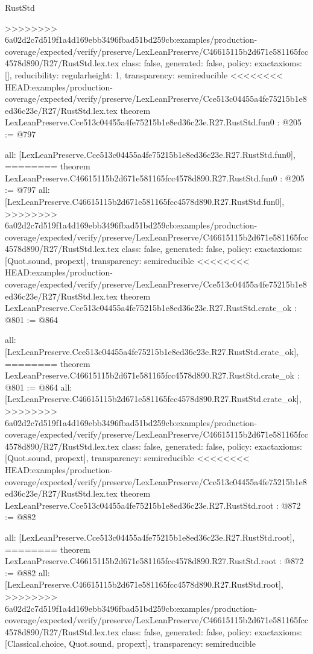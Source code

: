 \begin{lexlean}{RustStd}
\begin{coremodule}
{\begin{coremodule}
{{{>>>>>>>> 6a02d2c7d519f1a4d169ebb3496fbad51bd259cb:examples/production-coverage/expected/verify/preserve/LexLeanPreserve/C46615115b2d671e581165fcc4578d890/R27/RustStd.lex.tex
  class: false,
  generated: false,
  policy: exact{axioms: []},
  reducibility: regular{height: 1},
  transparency: semireducible
}
<<<<<<<< HEAD:examples/production-coverage/expected/verify/preserve/LexLeanPreserve/Cce513c04455a4fe75215b1e8ed36c23e/R27/RustStd.lex.tex
theorem LexLeanPreserve.Cce513c04455a4fe75215b1e8ed36c23e.R27.RustStd.fun0 : @205 := @797 {
  all: [LexLeanPreserve.Cce513c04455a4fe75215b1e8ed36c23e.R27.RustStd.fun0],
========
theorem LexLeanPreserve.C46615115b2d671e581165fcc4578d890.R27.RustStd.fun0 : @205 := @797 {
  all: [LexLeanPreserve.C46615115b2d671e581165fcc4578d890.R27.RustStd.fun0],
>>>>>>>> 6a02d2c7d519f1a4d169ebb3496fbad51bd259cb:examples/production-coverage/expected/verify/preserve/LexLeanPreserve/C46615115b2d671e581165fcc4578d890/R27/RustStd.lex.tex
  class: false,
  generated: false,
  policy: exact{axioms: [Quot.sound, propext]},
  transparency: semireducible
}
<<<<<<<< HEAD:examples/production-coverage/expected/verify/preserve/LexLeanPreserve/Cce513c04455a4fe75215b1e8ed36c23e/R27/RustStd.lex.tex
theorem LexLeanPreserve.Cce513c04455a4fe75215b1e8ed36c23e.R27.RustStd.crate_ok : @801 := @864 {
  all: [LexLeanPreserve.Cce513c04455a4fe75215b1e8ed36c23e.R27.RustStd.crate_ok],
========
theorem LexLeanPreserve.C46615115b2d671e581165fcc4578d890.R27.RustStd.crate_ok : @801 := @864 {
  all: [LexLeanPreserve.C46615115b2d671e581165fcc4578d890.R27.RustStd.crate_ok],
>>>>>>>> 6a02d2c7d519f1a4d169ebb3496fbad51bd259cb:examples/production-coverage/expected/verify/preserve/LexLeanPreserve/C46615115b2d671e581165fcc4578d890/R27/RustStd.lex.tex
  class: false,
  generated: false,
  policy: exact{axioms: [Quot.sound, propext]},
  transparency: semireducible
}
<<<<<<<< HEAD:examples/production-coverage/expected/verify/preserve/LexLeanPreserve/Cce513c04455a4fe75215b1e8ed36c23e/R27/RustStd.lex.tex
theorem LexLeanPreserve.Cce513c04455a4fe75215b1e8ed36c23e.R27.RustStd.root : @872 := @882 {
  all: [LexLeanPreserve.Cce513c04455a4fe75215b1e8ed36c23e.R27.RustStd.root],
========
theorem LexLeanPreserve.C46615115b2d671e581165fcc4578d890.R27.RustStd.root : @872 := @882 {
  all: [LexLeanPreserve.C46615115b2d671e581165fcc4578d890.R27.RustStd.root],
>>>>>>>> 6a02d2c7d519f1a4d169ebb3496fbad51bd259cb:examples/production-coverage/expected/verify/preserve/LexLeanPreserve/C46615115b2d671e581165fcc4578d890/R27/RustStd.lex.tex
  class: false,
  generated: false,
  policy: exact{axioms: [Classical.choice, Quot.sound, propext]},
  transparency: semireducible
}

}}}}}
\end{coremodule}}
\end{coremodule}
\end{lexlean}
